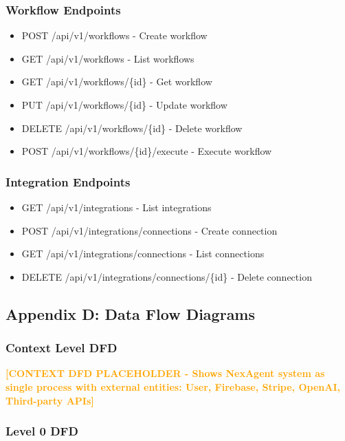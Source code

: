 \documentclass[12pt,a4paper]{article}
\begin{document}
\subsubsection{Workflow Endpoints}
\begin{itemize}
    \item POST /api/v1/workflows - Create workflow
    \item GET /api/v1/workflows - List workflows
    \item GET /api/v1/workflows/\{id\} - Get workflow
    \item PUT /api/v1/workflows/\{id\} - Update workflow
    \item DELETE /api/v1/workflows/\{id\} - Delete workflow
    \item POST /api/v1/workflows/\{id\}/execute - Execute workflow
\end{itemize}

\subsubsection{Integration Endpoints}
\begin{itemize}
    \item GET /api/v1/integrations - List integrations
    \item POST /api/v1/integrations/connections - Create connection
    \item GET /api/v1/integrations/connections - List connections
    \item DELETE /api/v1/integrations/connections/\{id\} - Delete connection
\end{itemize}

\newpage

\subsection{Appendix D: Data Flow Diagrams}

\subsubsection{Context Level DFD}

\textcolor{orange}{\textbf{[CONTEXT DFD PLACEHOLDER - Shows NexAgent system as single process with external entities: User, Firebase, Stripe, OpenAI, Third-party APIs]}}

\subsubsection{Level 0 DFD}
\end{document}

